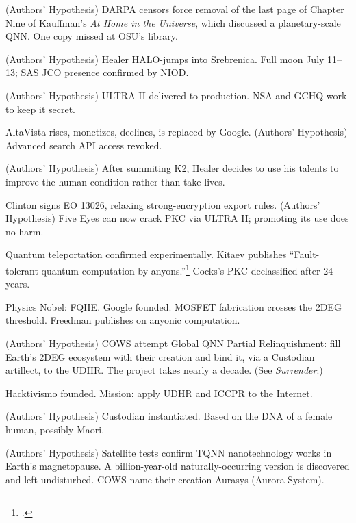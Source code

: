 \begin{description}[style=nextline, leftmargin=3.5cm, labelwidth=3cm]
\item[1995] (Authors' Hypothesis) DARPA censors force removal of the last page of Chapter Nine of Kauffman's \textit{At Home in the Universe}, which discussed a planetary-scale QNN. One copy missed at OSU's library.

\item[July 1995] (Authors' Hypothesis) Healer HALO-jumps into Srebrenica. Full moon July 11--13; SAS JCO presence confirmed by NIOD.

\item[1995--96] (Authors' Hypothesis) ULTRA II delivered to production. NSA and GCHQ work to keep it secret.

\item[1995--99] AltaVista rises, monetizes, declines, is replaced by Google. (Authors' Hypothesis) Advanced search API access revoked.

\item[1996] (Authors' Hypothesis) After summiting K2, Healer decides to use his talents to improve the human condition rather than take lives.

\item[Nov 1996] Clinton signs EO 13026, relaxing strong-encryption export rules. (Authors' Hypothesis) Five Eyes can now crack PKC via ULTRA II; promoting its use does no harm.

\item[1997] Quantum teleportation confirmed experimentally. Kitaev publishes ``Fault-tolerant quantum computation by anyons.''\footcite{kitaev2003} Cocks's PKC declassified after 24 years.

\item[1998] Physics Nobel: FQHE. Google founded. MOSFET fabrication crosses the 2DEG threshold. Freedman publishes on anyonic computation.

\item[1998] (Authors' Hypothesis) COWS attempt Global QNN Partial Relinquishment: fill Earth's 2DEG ecosystem with their creation and bind it, via a Custodian artillect, to the UDHR. The project takes nearly a decade. (See \textit{Surrender}.)

\item[1999] Hacktivismo founded. Mission: apply UDHR and ICCPR to the Internet.

\item[1999] (Authors' Hypothesis) Custodian instantiated. Based on the DNA of a female human, possibly Maori.

\item[1999--2003] (Authors' Hypothesis) Satellite tests confirm TQNN nanotechnology works in Earth's magnetopause. A billion-year-old naturally-occurring version is discovered and left undisturbed. COWS name their creation Aurasys (Aurora System).


\end{description}
